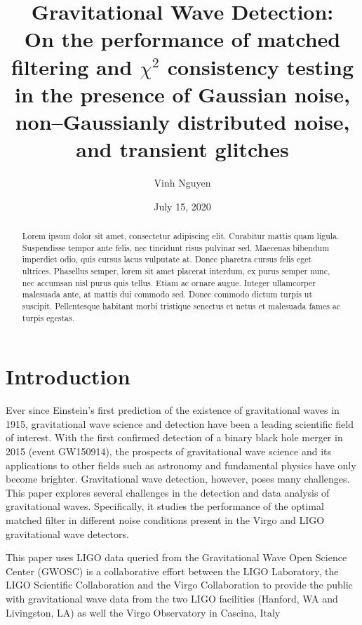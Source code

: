 \documentclass[preprint,
letterpaper,
 amsmath,amssymb,
 aps,
]{revtex4-2}
\begin{document}
\doublespacing
\title{Gravitational Wave Detection:\\
On the performance of matched filtering and $\chi^2$ consistency testing in the presence of Gaussian noise, non–Gaussianly distributed noise, and transient glitches}
\author{Vinh Nguyen}
\date{July 15, 2020}
\begin{abstract}
Lorem ipsum dolor sit amet, consectetur adipiscing elit. Curabitur mattis quam ligula. Suspendisse tempor ante felis, nec tincidunt risus pulvinar sed. Maecenas bibendum imperdiet odio, quis cursus lacus vulputate at. Donec pharetra cursus felis eget ultrices. Phasellus semper, lorem sit amet placerat interdum, ex purus semper nunc, nec accumsan nisl purus quis tellus. Etiam ac ornare augue. Integer ullamcorper malesuada ante, at mattis dui commodo sed. Donec commodo dictum turpis ut suscipit. Pellentesque habitant morbi tristique senectus et netus et malesuada fames ac turpis egestas.
\end{abstract}
\maketitle
\section{Introduction}
Ever since Einstein's first prediction of the existence of gravitational waves in 1915, gravitational wave science and detection have been a leading scientific field of interest. With the first confirmed detection of a binary black hole merger in 2015 (event GW150914), the prospects of gravitational wave science and its applications to other fields such as astronomy and fundamental physics have only become brighter. Gravitational wave detection, however, poses many challenges. This paper explores several challenges in the detection and data analysis of gravitational waves. Specifically, it studies the performance of the optimal matched filter in different noise conditions present in the Virgo and LIGO gravitational wave detectors.

This paper uses LIGO data queried from the Gravitational Wave Open Science Center (GWOSC) is a collaborative effort between the LIGO Laboratory, the LIGO Scientific Collaboration and the Virgo Collaboration to provide the public with gravitational wave data from the two LIGO facilities (Hanford, WA and Livingston, LA) as well the Virgo Observatory in Cascina, Italy
\end{document}
